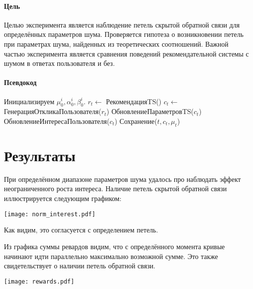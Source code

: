\documentclass[12pt, twoside]{article}
\begin{document}
\paragraph{Цель}
Целью эксперимента является наблюдение петель скрытой обратной связи для определённых параметров шума. 
Проверяется гипотеза о возникновении петель при параметрах шума, найденных из теоретических соотношений. 
Важной частью эксперимента является сравнения поведений рекомендательной системы с шумом в ответах пользователя и без. 

\paragraph{Псевдокод}
\begin{algorithmic}
  \STATE Инициализируем $\mu_0^i, \alpha_0^i, \beta_0^i$.
    \STATE $r_t \leftarrow$ РекомендацияTS()
    \STATE $c_t \leftarrow$ ГенерацияОткликаПользователя($r_t$)
    \STATE ОбновлениеПараметровTS($c_t$)
    \STATE ОбновлениеИнтересаПользователя($c_t$)
    \STATE Сохранение($t, c_t, \mu_t$)
  \ENDFOR
\end{algorithmic}

\section{Результаты}
При определённом диапазоне параметров шума удалось про наблюдать эффект неограниченного роста интереса. 
Наличие петель скрытой обратной связи иллюстрируется следующим графиком: 
\begin{center}
  \texttt{[image: norm\_interest.pdf]}
\end{center}
Как видим, это согласуется с определением петель. 

Из графика суммы ревардов видим, что с определённого момента кривые начинают идти параллельно максимально возможной сумме. 
Это также свидетельствует о наличии петель обратной связи. 
\begin{center}
  \texttt{[image: rewards.pdf]}
\end{center}
\end{document}
